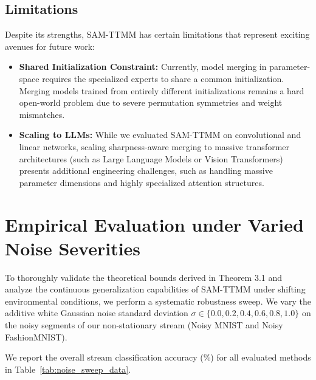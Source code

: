 \documentclass{article}
\theoremstyle{plain}
\theoremstyle{definition}
\theoremstyle{remark}
\begin{document}
\subsection{Limitations}
Despite its strengths, SAM-TTMM has certain limitations that represent exciting avenues for future work:
\begin{itemize}
    \item \textbf{Shared Initialization Constraint:} Currently, model merging in parameter-space requires the specialized experts to share a common initialization. Merging models trained from entirely different initializations remains a hard open-world problem due to severe permutation symmetries and weight mismatches.
    \item \textbf{Scaling to LLMs:} While we evaluated SAM-TTMM on convolutional and linear networks, scaling sharpness-aware merging to massive transformer architectures (such as Large Language Models or Vision Transformers) presents additional engineering challenges, such as handling massive parameter dimensions and highly specialized attention structures.
\end{itemize}

\section{Empirical Evaluation under Varied Noise Severities}
\label{app:noise_sweep}
To thoroughly validate the theoretical bounds derived in Theorem 3.1 and analyze the continuous generalization capabilities of SAM-TTMM under shifting environmental conditions, we perform a systematic robustness sweep. We vary the additive white Gaussian noise standard deviation $\sigma \in \{0.0, 0.2, 0.4, 0.6, 0.8, 1.0\}$ on the noisy segments of our non-stationary stream (Noisy MNIST and Noisy FashionMNIST).

We report the overall stream classification accuracy (\%) for all evaluated methods in Table~\ref{tab:noise_sweep_data}.
\end{document}

